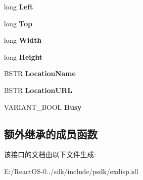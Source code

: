 \begin{DoxyCompactItemize}
long {\bfseries Left}
\item 
\mbox{\label{interface_s_h_doc_vw_1_1_i_web_browser_a6d92f4f00f3fbd7689f95bc43cb122c5}} 
long {\bfseries Top}
\item 
\mbox{\label{interface_s_h_doc_vw_1_1_i_web_browser_a74d79570617fdea9394e037aade3ea08}} 
long {\bfseries Width}
\item 
\mbox{\label{interface_s_h_doc_vw_1_1_i_web_browser_ae67b53231a0e3a2c0606e75d33624a40}} 
long {\bfseries Height}
\item 
\mbox{\label{interface_s_h_doc_vw_1_1_i_web_browser_a47dc362bd1443a4ce6f4fbf98fecdb97}} 
B\+S\+TR {\bfseries Location\+Name}
\item 
\mbox{\label{interface_s_h_doc_vw_1_1_i_web_browser_a56e22637c0409261eb123ebe94ecc122}} 
B\+S\+TR {\bfseries Location\+U\+RL}
\item 
\mbox{\label{interface_s_h_doc_vw_1_1_i_web_browser_a5313577c8c5a99d4cd5b18b7bb1dd555}} 
V\+A\+R\+I\+A\+N\+T\+\_\+\+B\+O\+OL {\bfseries Busy}
\end{DoxyCompactItemize}
\subsection*{额外继承的成员函数}


该接口的文档由以下文件生成\+:\begin{DoxyCompactItemize}
\item 
E\+:/\+React\+O\+S-\/0../sdk/include/psdk/exdisp.\+idl\end{DoxyCompactItemize}
